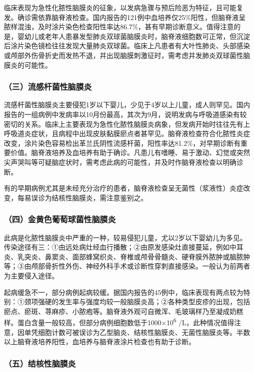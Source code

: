 临床表现为急性化脓性脑膜炎的征象，以发病急骤与预后险恶为特征，且可能复发。确诊需依靠脑脊液检查。国内报告的121例中血培养仅25\%阳性，但脑脊液呈脓样混浊，及时涂片染色检查阳性率达86.7\%，甚有早期诊断意义。值得注意的是，婴幼儿或老年人患暴发型肺炎双球菌脑膜炎时，脑脊液细胞数可正常，但沉淀后涂片染色镜检往往发现大量肺炎双球菌。临床上凡患者有大叶性肺炎、头部感染或颅部外伤骨折史而发热不退，并出现脑膜刺激征时，需考虑并发肺炎双球菌性脑膜炎的可能性。

\subsubsection{（三）流感杆菌性脑膜炎}

流感杆菌性脑膜炎主要侵犯1岁以下婴儿，少见于4岁以上儿童，成人则罕见。国内报告的一组病例中发病率以10月份最高，其次为9月，说明发病与呼吸道感染有较密切的关系。临床上主要表现为急性化脓性脑膜炎病象，但发病开始时往往先有上呼吸道炎症状，且病程中出现皮肤黏膜瘀点者甚罕见。脑脊液检查符合化脓性炎症改变，涂片染色容易检出革兰氏阴性流感杆菌，阳性率达81.2\%，对早期诊断有重要价值。脑脊液培养及血培养有助于确诊。凡患儿有嗜睡、易于激动、幻觉或突然尖声哭叫等可疑脑症状时，需考虑此病的可能性，并及时作脑脊液检查以明确诊断。

有的早期病例尤其是未经充分治疗的患者，脑脊液检查呈无菌性（浆液性）炎症改变，每易误诊为结核性脑膜炎，需注意鉴别之。

\subsubsection{（四）金黄色葡萄球菌性脑膜炎}

此病是化脓性脑膜炎中严重的一种，较易侵犯儿童，尤以2岁以下婴幼儿为多见。传染途径有三：①由远处病灶经血行播散；②由原发感染灶直接蔓延，例如中耳炎、乳突炎、鼻窦炎、面部蜂窝织炎、脊椎或颅骨骨髓炎、硬脊膜外脓肿或脑脓肿等；③由颅部骨折性外伤、神经外科手术或诊断性穿刺直接感染。一般认为前两者为主要侵入途径。

起病缓急不一，部分病例起病较缓。据国内报告的45例中，临床表现有两点较为特别：①颈项强硬的发生率与强度均较一般脑膜炎高；②各种类型皮疹的出现，包括瘀点、瘀斑、荨麻疹、小脓疱等。脑脊液外观可自微浑、毛玻璃样乃至凝成奶糕样。蛋白含量一般较高，但部分病例细胞数低于1000×10\textsuperscript{6}
/L，此种情况值得注意，因单凭细胞计数可被误诊为乙型脑炎、结核性脑膜炎、无菌性脑膜炎等。半数以上脑脊液培养阳性，血培养与脑脊液涂片检查也有助于诊断。

\subsubsection{（五）结核性脑膜炎}

